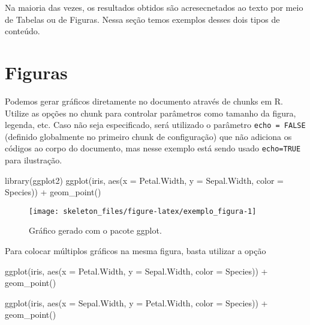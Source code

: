 \documentclass[
	oldfontcommands,
	sumario=abnt-6027-2012,
	12pt,
	openright,
	oneside,
	a4paper,
	english,
	english
	]{imecc-unicamp}
\newenvironment{Shaded}{\begin{snugshade}}{\end{snugshade}}
\newcommand{\AttributeTok}[1]{\textcolor[rgb]{0.77,0.63,0.00}{#1}}
\newcommand{\FunctionTok}[1]{\textcolor[rgb]{0.00,0.00,0.00}{#1}}
\newcommand{\NormalTok}[1]{#1}
\newcommand{\SpecialCharTok}[1]{\textcolor[rgb]{0.00,0.00,0.00}{#1}}
\begin{document}
Na maioria das vezes, os resultados obtidos são acresecnetados ao texto
por meio de Tabelas ou de Figuras. Nessa seção temos exemplos desses
dois tipos de conteúdo.

\section{Figuras}

Podemos gerar gráficos diretamente no documento através de chunks em R.
Utilize as opções no chunk para controlar parâmetros como tamanho da
figura, legenda, etc. Caso não seja especificado, será utilizado o
parâmetro \texttt{echo\ =\ FALSE} (definido globalmente no primeiro
chunk de configuração) que não adiciona os códigos ao corpo do
documento, mas nesse exemplo está sendo usado \texttt{echo=TRUE} para
ilustração.

\begin{Shaded}
\begin{Highlighting}[]
\FunctionTok{library}\NormalTok{(ggplot2)}
\FunctionTok{ggplot}\NormalTok{(iris, }\FunctionTok{aes}\NormalTok{(}\AttributeTok{x =}\NormalTok{ Petal.Width,}
                 \AttributeTok{y =}\NormalTok{ Sepal.Width, }
                 \AttributeTok{color =}\NormalTok{ Species)) }\SpecialCharTok{+}
  \FunctionTok{geom\_point}\NormalTok{()}
\end{Highlighting}
\end{Shaded}

\begin{figure}[h]

{\centering \texttt{[image: skeleton\_files/figure-latex/exemplo\_figura-1]} 

}

\caption{Gráfico gerado com o pacote ggplot.}\label{fig:exemplo_figura}
\end{figure}

Para colocar múltiplos gráficos na mesma figura, basta utilizar a opção

\begin{Shaded}
\begin{Highlighting}[]
\FunctionTok{ggplot}\NormalTok{(iris, }\FunctionTok{aes}\NormalTok{(}\AttributeTok{x =}\NormalTok{ Petal.Width,}
                 \AttributeTok{y =}\NormalTok{ Sepal.Width, }
                 \AttributeTok{color =}\NormalTok{ Species)) }\SpecialCharTok{+}
  \FunctionTok{geom\_point}\NormalTok{()}

\FunctionTok{ggplot}\NormalTok{(iris, }\FunctionTok{aes}\NormalTok{(}\AttributeTok{x =}\NormalTok{ Sepal.Width,}
                 \AttributeTok{y =}\NormalTok{ Petal.Width, }
                 \AttributeTok{color =}\NormalTok{ Species)) }\SpecialCharTok{+}
  \FunctionTok{geom\_point}\NormalTok{()}
\end{Highlighting}
\end{Shaded}
\end{document}
